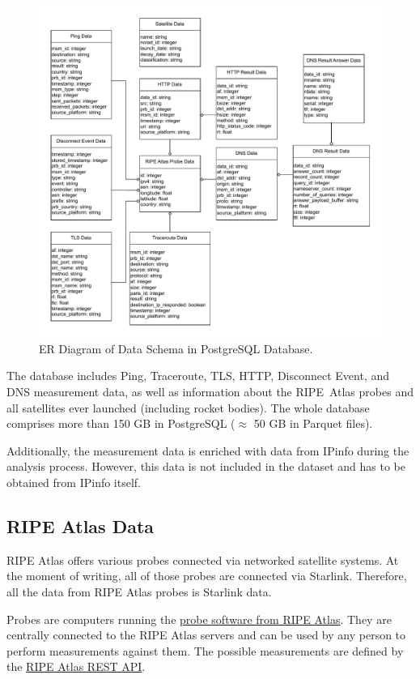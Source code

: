 \begin{figure}
	\includegraphics[width=\textwidth]{./chapters/3-methodology/img/er-diagram.drawio.pdf}
	\caption{ER Diagram of Data Schema in PostgreSQL Database.}
	\label{fig:er-diagram}
\end{figure}

The database includes Ping, Traceroute, TLS, HTTP, Disconnect Event, and DNS
measurement data, as well as information about the RIPE~Atlas probes and all
satellites ever launched (including rocket bodies). The whole database
comprises more than 150 GB in PostgreSQL ($\approx$ 50 GB in Parquet files).

Additionally, the measurement data is enriched with data from IPinfo during the
analysis process. However, this data is not included in the dataset and has to
be obtained from IPinfo itself.

\subsection*{RIPE Atlas Data}

RIPE Atlas offers various probes connected via networked satellite systems. At
the moment of writing, all of those probes are connected via Starlink.
Therefore, all the data from RIPE Atlas probes is Starlink data.

Probes are computers running the
\href{https://github.com/RIPE-NCC/ripe-atlas-software-probe}{probe software
	from RIPE Atlas}. They are centrally connected to the RIPE Atlas
servers and
can be used by any person to perform measurements against them. The possible
measurements are defined by the
\href{https://atlas.ripe.net/docs/apis/rest-api-reference/}{RIPE Atlas REST
	API}.


